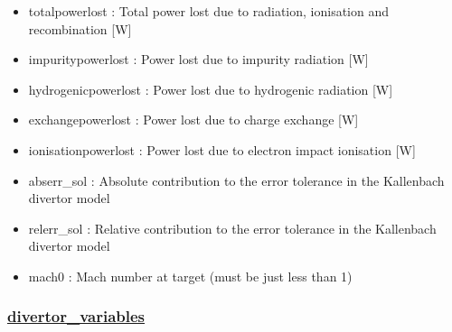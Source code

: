 \documentclass[]{article}
\begin{document}
\begin{itemize}
\item
  totalpowerlost : Total power lost due to radiation, ionisation and
  recombination {[}W{]}
\item
  impuritypowerlost : Power lost due to impurity radiation {[}W{]}
\item
  hydrogenicpowerlost : Power lost due to hydrogenic radiation {[}W{]}
\item
  exchangepowerlost : Power lost due to charge exchange {[}W{]}
\item
  ionisationpowerlost : Power lost due to electron impact ionisation
  {[}W{]}
\item
  abserr\_sol : Absolute contribution to the error tolerance in the
  Kallenbach divertor model
\item
  relerr\_sol : Relative contribution to the error tolerance in the
  Kallenbach divertor model
\item
  mach0 : Mach number at target (must be just less than 1)
\end{itemize}

\subsubsection{\texorpdfstring{\href{divertor_variables.html}{divertor\_variables}}{divertor\_variables}}\label{divertor_variables}
\end{document}
